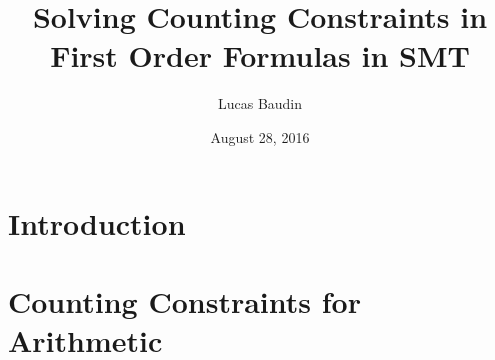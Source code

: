 \documentclass[]{article}
\title{Solving Counting Constraints in First Order Formulas in SMT}
\date{August 28, 2016}
\author{Lucas Baudin}
\begin{document}
\maketitle

{
\setcounter{tocdepth}{3}
\tableofcontents
}

\newtheorem{definition}{Definition} \newtheorem{lemma}{Lemma}
\newtheorem{theorem}{Theorem} \newtheorem{property}{Property}


\newpage

\section*{Introduction}\label{introduction}
\label{sec:intro}


\section{Counting Constraints for Arithmetic}
\label{sec:arith}






\end{document}
